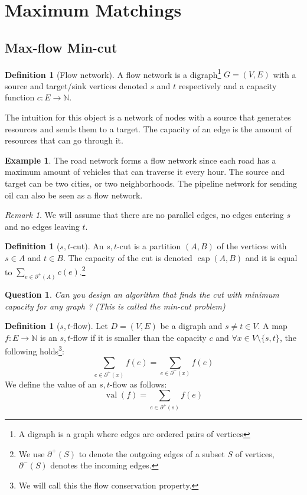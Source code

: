 \documentclass{tufte-handout}
\newtheorem{quest}[thm]{Question}
\theoremstyle{definition}
\newtheorem{defn}[thm]{Definition}
\newtheorem{exmp}[thm]{Example}
\theoremstyle{remark}
\newtheorem{rem}[thm]{Remark}
\newcommand{\N}{\mathbb{N}}
\DeclareMathOperator{\val}{val}
\DeclareMathOperator{\capac}{cap}
\begin{document}
\section{Maximum Matchings}
\subsection{Max-flow Min-cut}
\begin{defn}[Flow network]
	A flow network is a digraph\footnote{A digraph is a graph where edges are ordered pairs of vertices} $G = (V,E)$ with a source and target/sink vertices denoted $s$ and $t$ respectively and a capacity function $c:E\rightarrow \N$.
\end{defn}
The intuition for this object is a network of nodes with a source that generates resources and sends them to a target. The capacity of an edge is the amount of resources that can go through it.
\begin{exmp}
	The road network forms a flow network since each road has a maximum amount of vehicles that can traverse it every hour. The source and target can be two cities, or two neighborhoods.
	The pipeline network for sending oil can also be seen as a flow network.
\end{exmp}
\begin{rem}
	We will assume that there are no parallel edges, no edges entering $s$ and no edges leaving $t$.
\end{rem}
\begin{defn}[$s,t$-cut]
	An $s,t$-cut is a partition $(A,B)$ of the vertices with $s \in A$ and $t \in B$. The capacity of the cut is denoted $\capac(A,B)$ and it is equal to $\sum_{e \in \partial^+(A)} c(e)$.\footnote{We use $\partial^+(S)$ to denote the outgoing edges of a subset $S$ of vertices, $\partial^-(S)$ denotes the incoming edges.}
\end{defn}
\begin{quest}
	Can you design an algorithm that finds the cut with minimum capacity for any graph ? (This is called the min-cut problem)
\end{quest}
\begin{defn}[$s,t$-flow]
	Let $D= (V,E)$ be a digraph and $s\neq t \in V$. A map $f : E \rightarrow \N$ is an $s,t$-flow if it is smaller than the capacity $c$ and $\forall x \in V \setminus\{s,t\}$, the following holds\footnote{We will call this the flow conservation property.}:
	\[ \sum_{e \in \partial^+(x)}f(e) = \sum_{e \in \partial^-(x)}f(e) \]
	We define the value of an $s,t$-flow as follows:
	\[ \val(f) = \sum_{e \in \partial^+(s)}f(e)\]
\end{defn}
\end{document}
